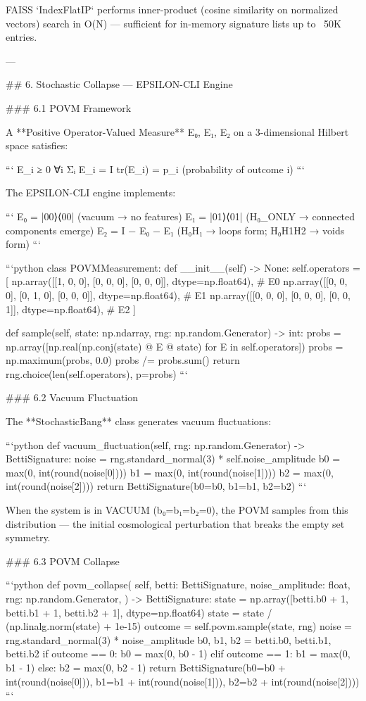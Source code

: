 FAISS `IndexFlatIP` performs inner-product (cosine similarity on normalized vectors) search in O(N) — sufficient for in-memory signature lists up to ~50K entries.

---

## 6. Stochastic Collapse — EPSILON-CLI Engine

### 6.1 POVM Framework

A **Positive Operator-Valued Measure** {E₀, E₁, E₂} on a 3-dimensional Hilbert space satisfies:

```
E_i ≥ 0    ∀i
Σᵢ E_i = I
tr(E_i) = p_i   (probability of outcome i)
```

The EPSILON-CLI engine implements:

```
E₀ = |00⟩⟨00|   (vacuum → no features)
E₁ = |01⟩⟨01|   (H₀_ONLY → connected components emerge)
E₂ = I − E₀ − E₁  (H₀H₁ → loops form; H₀H1H2 → voids form)
```

```python
class POVMMeasurement:
    def __init__(self) -> None:
        self.operators = [
            np.array([[1, 0, 0], [0, 0, 0], [0, 0, 0]], dtype=np.float64),  # E0
            np.array([[0, 0, 0], [0, 1, 0], [0, 0, 0]], dtype=np.float64),  # E1
            np.array([[0, 0, 0], [0, 0, 0], [0, 0, 1]], dtype=np.float64),  # E2
        ]

    def sample(self, state: np.ndarray, rng: np.random.Generator) -> int:
        probs = np.array([np.real(np.conj(state) @ E @ state) for E in self.operators])
        probs = np.maximum(probs, 0.0)
        probs /= probs.sum()
        return rng.choice(len(self.operators), p=probs)
```

### 6.2 Vacuum Fluctuation

The **StochasticBang** class generates vacuum fluctuations:

```python
def vacuum_fluctuation(self, rng: np.random.Generator) -> BettiSignature:
    noise = rng.standard_normal(3) * self.noise_amplitude
    b0 = max(0, int(round(noise[0])))
    b1 = max(0, int(round(noise[1])))
    b2 = max(0, int(round(noise[2])))
    return BettiSignature(b0=b0, b1=b1, b2=b2)
```

When the system is in VACUUM (b₀=b₁=b₂=0), the POVM samples from this distribution — the initial cosmological perturbation that breaks the empty set symmetry.

### 6.3 POVM Collapse

```python
def povm_collapse(
    self,
    betti: BettiSignature,
    noise_amplitude: float,
    rng: np.random.Generator,
) -> BettiSignature:
    state = np.array([betti.b0 + 1, betti.b1 + 1, betti.b2 + 1], dtype=np.float64)
    state = state / (np.linalg.norm(state) + 1e-15)
    outcome = self.povm.sample(state, rng)
    noise = rng.standard_normal(3) * noise_amplitude
    b0, b1, b2 = betti.b0, betti.b1, betti.b2
    if outcome == 0:
        b0 = max(0, b0 - 1)
    elif outcome == 1:
        b1 = max(0, b1 - 1)
    else:
        b2 = max(0, b2 - 1)
    return BettiSignature(b0=b0 + int(round(noise[0])), b1=b1 + int(round(noise[1])), b2=b2 + int(round(noise[2])))
```


